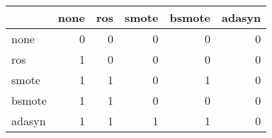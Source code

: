 \begin{tabular}{lrrrrr}
\hline
        &   none &   ros &   smote &   bsmote &   adasyn \\
\hline
 none   &      0 &     0 &       0 &        0 &        0 \\
 ros    &      1 &     0 &       0 &        0 &        0 \\
 smote  &      1 &     1 &       0 &        1 &        0 \\
 bsmote &      1 &     1 &       0 &        0 &        0 \\
 adasyn &      1 &     1 &       1 &        1 &        0 \\
\hline
\end{tabular}